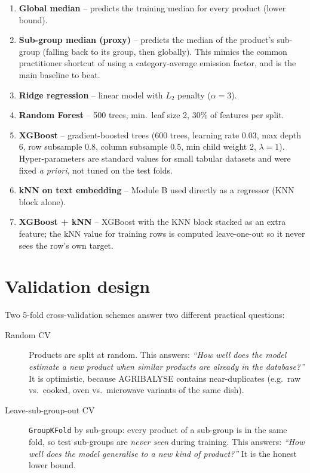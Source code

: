 \begin{enumerate}
  \item \textbf{Global median} -- predicts the training median for every product (lower bound).
  \item \textbf{Sub-group median (proxy)} -- predicts the median of the product's sub-group
  (falling back to its group, then globally). This mimics the common practitioner shortcut of
  using a category-average emission factor, and is the main baseline to beat.
  \item \textbf{Ridge regression} \citep{hoerl1970} -- linear model with $L_2$ penalty ($\alpha=3$).
  \item \textbf{Random Forest} \citep{breiman2001} -- 500 trees, min.\ leaf size 2, 30\% of
  features per split.
  \item \textbf{XGBoost} \citep{chen2016xgboost} -- gradient-boosted trees (600 trees, learning
  rate 0.03, max depth 6, row subsample 0.8, column subsample 0.5, min child weight 2,
  $\lambda=1$). Hyper-parameters are standard values for small tabular datasets and were fixed
  \emph{a priori}, not tuned on the test folds.
  \item \textbf{kNN on text embedding} -- Module B used directly as a regressor (KNN block alone).
  \item \textbf{XGBoost + kNN} -- XGBoost with the KNN block stacked as an extra feature; the kNN
  value for training rows is computed leave-one-out so it never sees the row's own target.
\end{enumerate}

\section{Validation design}
\label{sec:validation}

Two 5-fold cross-validation schemes answer two different practical questions:

\begin{description}
  \item[Random CV] Products are split at random. This answers: \emph{``How well does the model
  estimate a new product when similar products are already in the database?''} It is optimistic,
  because AGRIBALYSE contains near-duplicates (e.g.\ raw vs.\ cooked, oven vs.\ microwave
  variants of the same dish).
  \item[Leave-sub-group-out CV] \texttt{GroupKFold} by sub-group: every product of a sub-group is
  in the same fold, so test sub-groups are \emph{never seen} during training. This answers:
  \emph{``How well does the model generalise to a new kind of product?''} It is the honest lower
  bound.
\end{description}

